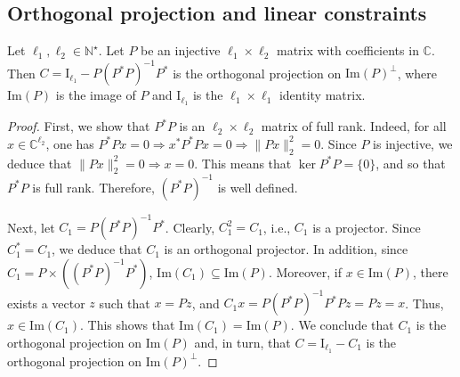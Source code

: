 \subsection{Orthogonal projection and linear constraints}
\label{sec:constraints}
\begin{lemma}
    \label{lem:ortho}
    Let $\ell_1, \ell_2 \in \mathbb N^\star$. Let $P$ be an injective $\ell_1 \times \ell_2$ matrix with coefficients in $\mathbb C$. Then
    $C = \mathrm{I}_{\ell_1} - P(P^\ast P)^{-1}P^\ast$ is the orthogonal projection on $\mathrm{Im}(P)^\perp$, where $\mathrm{Im}(P)$ is the image  of $P$ and $\mathrm{I}_{\ell_1}$ is the $\ell_1\times \ell_1$ identity matrix.
\end{lemma}
\begin{proof}
First, we show that $P^\ast P$ is an $\ell_2 \times \ell_2$ matrix of full rank. Indeed, for all $x\in \mathbb C^{\ell_2}$, one has $P^\ast P x = 0 \Rightarrow x^\ast P^\ast P x = 0 \Rightarrow \|Px\|_2^2 = 0$. Since $P$ is injective, we deduce that $\|Px\|_2^2 = 0 \Rightarrow x = 0$. This means that $\ker P^\ast P = \{0\}$, and so that $P^\ast P$ is full rank. Therefore, $(P^\ast P)^{-1}$ is well defined.

Next, let $C_1 = P(P^\ast P)^{-1}P^\ast$. Clearly, $C_1^2 = C_1$, i.e., $C_1$ is a projector. Since $C_1^\ast = C_1$, we deduce that $C_1$ is an orthogonal projector.
 In addition, since $C_1 = P\times ((P^\ast P)^{-1}P^\ast)$, $\mathrm{Im}(C_1) \subseteq \mathrm{Im}(P)$. Moreover, if $x \in \mathrm{Im}(P)$, there exists a vector $ z$ such that $x = Pz$, and $C_1x = P(P^\ast P)^{-1}P^\ast Pz = Pz =x$. Thus, $x \in \mathrm{Im}(C_1)$. This shows that $\mathrm{Im}(C_1) = \mathrm{Im}(P)$. We conclude that $C_1$ is the orthogonal projection on $\mathrm{Im}(P)$ and, in turn, that $C = \mathrm{I}_{\ell_1} - C_1$ is the orthogonal projection on $\mathrm{Im}(P)^\perp$.
\end{proof}

